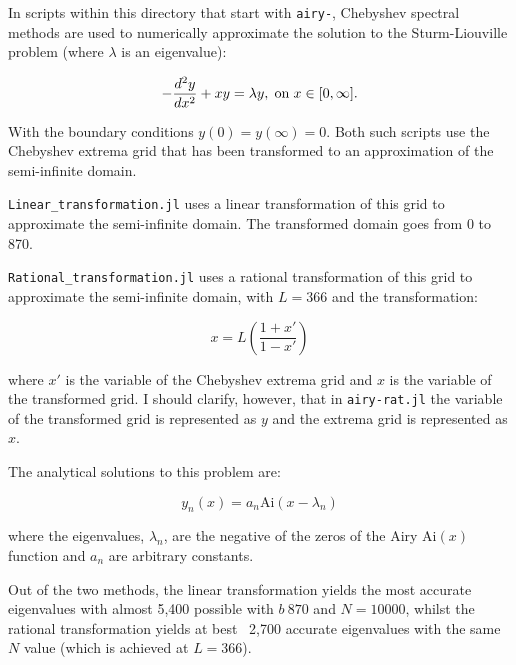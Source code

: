 \documentclass[12pt,a4paper,openright]{article}
\begin{document}
	In scripts within this directory that start with \texttt{airy-}, Chebyshev spectral methods are used to numerically approximate the solution to the Sturm-Liouville problem (where $\lambda$ is an eigenvalue):

	\[
	- \dfrac{d^2 y}{dx^2} + xy = \lambda y, \hspace{0.1cm}\mathrm{on} \hspace{0.1cm} x\in[0,\infty].
	\]

	With the boundary conditions $y(0)=y(\infty)=0$. Both such scripts use the Chebyshev extrema grid that has been transformed to an approximation of the semi-infinite domain. 

	\texttt{Linear\_transformation.jl} uses a linear transformation of this grid to approximate the semi-infinite domain. The transformed domain goes from 0 to 870.
	
	\texttt{Rational\_transformation.jl} uses a rational transformation of this grid to approximate the semi-infinite domain, with $L=366$ and the transformation:
	
	\[
	x = L \left(\dfrac{1+x'}{1-x'}\right)
	\]

	where $x'$ is the variable of the Chebyshev extrema grid and $x$ is the variable of the transformed grid. I should clarify, however, that in \texttt{airy-rat.jl} the variable of the transformed grid is represented as $ y $ and the extrema grid is represented as $ x $. 
	
	The analytical solutions to this problem are:

	\[
	y_n(x) = a_n \mathrm{Ai}(x-\lambda_n)
	\]

	where the eigenvalues, $\lambda_n$, are the negative of the zeros of the Airy $\mathrm{Ai}(x)$ function and $a_n$ are arbitrary constants.

	Out of the two methods, the linear transformation yields the most accurate eigenvalues with almost 5,400 possible with $b~870$ and $N=10000$, whilst the rational transformation yields at best ~2,700 accurate eigenvalues with the same $N$ value (which is achieved at $L=366$). 
\end{document}
